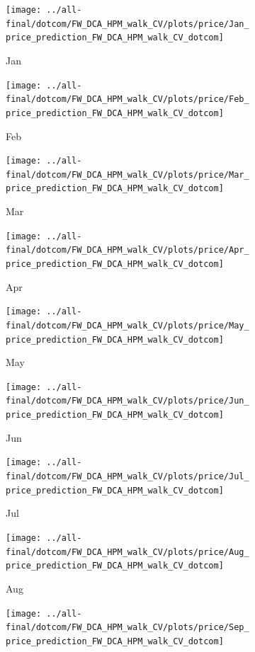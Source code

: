 \documentclass[ngerman]{ttlab-qualify}
\begin{document}
\newpage
\begin{figure}[H]
\centering
  \begin{subfigure}{.3\linewidth}
  \texttt{[image: ../all-final/dotcom/FW\_DCA\_HPM\_walk\_CV/plots/price/Jan\_price\_prediction\_FW\_DCA\_HPM\_walk\_CV\_dotcom]}\hfill
  \caption{Jan}
  \end{subfigure}
  \begin{subfigure}{.3\linewidth}
  \texttt{[image: ../all-final/dotcom/FW\_DCA\_HPM\_walk\_CV/plots/price/Feb\_price\_prediction\_FW\_DCA\_HPM\_walk\_CV\_dotcom]}\hfill
  \caption{Feb}
  \end{subfigure}
  \begin{subfigure}{.3\linewidth}
  \texttt{[image: ../all-final/dotcom/FW\_DCA\_HPM\_walk\_CV/plots/price/Mar\_price\_prediction\_FW\_DCA\_HPM\_walk\_CV\_dotcom]}\hfill
  \caption{Mar}
  \end{subfigure}\par\medskip
  \begin{subfigure}{.3\linewidth}
  \texttt{[image: ../all-final/dotcom/FW\_DCA\_HPM\_walk\_CV/plots/price/Apr\_price\_prediction\_FW\_DCA\_HPM\_walk\_CV\_dotcom]}\hfill
  \caption{Apr}
  \end{subfigure}
  \begin{subfigure}{.3\linewidth}
  \texttt{[image: ../all-final/dotcom/FW\_DCA\_HPM\_walk\_CV/plots/price/May\_price\_prediction\_FW\_DCA\_HPM\_walk\_CV\_dotcom]}\hfill
  \caption{May}
  \end{subfigure}
  \begin{subfigure}{.3\linewidth}
  \texttt{[image: ../all-final/dotcom/FW\_DCA\_HPM\_walk\_CV/plots/price/Jun\_price\_prediction\_FW\_DCA\_HPM\_walk\_CV\_dotcom]}\hfill
  \caption{Jun}
  \end{subfigure}\par\medskip
  \begin{subfigure}{.3\linewidth}
  \texttt{[image: ../all-final/dotcom/FW\_DCA\_HPM\_walk\_CV/plots/price/Jul\_price\_prediction\_FW\_DCA\_HPM\_walk\_CV\_dotcom]}\hfill
  \caption{Jul}
  \end{subfigure}
  \begin{subfigure}{.3\linewidth}
  \texttt{[image: ../all-final/dotcom/FW\_DCA\_HPM\_walk\_CV/plots/price/Aug\_price\_prediction\_FW\_DCA\_HPM\_walk\_CV\_dotcom]}\hfill
  \caption{Aug}
  \end{subfigure}
  \begin{subfigure}{.3\linewidth}
  \texttt{[image: ../all-final/dotcom/FW\_DCA\_HPM\_walk\_CV/plots/price/Sep\_price\_prediction\_FW\_DCA\_HPM\_walk\_CV\_dotcom]}\hfill

\end{subfigure}
\end{figure}
\end{document}
